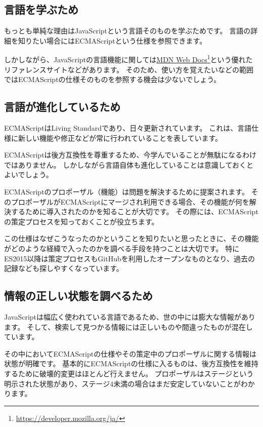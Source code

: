 \hypertarget{to-learn}{%
\subsection{言語を学ぶため}\label{to-learn}}

もっとも単純な理由はJavaScriptという言語そのものを学ぶためです。
言語の詳細を知りたい場合にはECMAScriptという仕様を参照できます。

しかしながら、JavaScriptの言語機能に関しては\href{https://developer.mozilla.org/ja/}{MDN
Web Docs}\footnote{\url{https://developer.mozilla.org/ja/}}という優れたリファレンスサイトなどがあります。
そのため、使い方を覚えたいなどの範囲ではECMAScriptの仕様そのものを参照する機会は少ないでしょう。

\hypertarget{to-progress}{%
\subsection{言語が進化しているため}\label{to-progress}}

ECMAScriptはLiving Standardであり、日々更新されています。
これは、言語仕様に新しい機能や修正などが常に行われていることを表しています。

ECMAScriptは後方互換性を尊重するため、今学んでいることが無駄になるわけではありません。
しかしながら言語自体も進化していることは意識しておくとよいでしょう。

ECMAScriptのプロポーザル（機能）は問題を解決するために提案されます。
そのプロポーザルがECMAScriptにマージされ利用できる場合、その機能が何を解決するために導入されたのかを知ることが大切です。
その際には、ECMAScriptの策定プロセスを知っておくことが役立ちます。

この仕様はなぜこうなったのかということを知りたいと思ったときに、その機能がどのような経緯で入ったのかを調べる手段を持つことは大切です。
特にES2015以降は策定プロセスもGitHubを利用したオープンなものとなり、過去の記録なども探しやすくなっています。

\hypertarget{to-search}{%
\subsection{情報の正しい状態を調べるため}\label{to-search}}

JavaScriptは幅広く使われている言語であるため、世の中には膨大な情報があります。
そして、検索して見つかる情報には正しいものや間違ったものが混在しています。

その中においてECMAScriptの仕様やその策定中のプロポーザルに関する情報は状態が明確です。
基本的にECMAScriptの仕様に入るものは、後方互換性を維持するために破壊的変更はほとんど行えません。
プロポーザルはステージという明示された状態があり、ステージ4未満の場合はまだ安定していないことがわかります。

